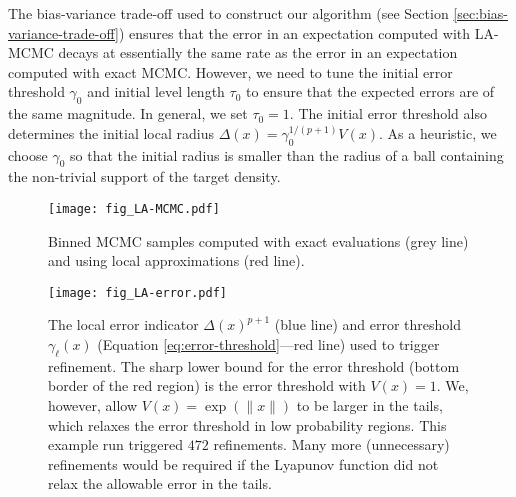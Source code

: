 The bias-variance trade-off used to construct our algorithm (see Section \ref{sec:bias-variance-trade-off}) ensures that the error in an expectation computed with LA-MCMC decays at essentially the same rate as the error in an expectation computed with exact MCMC. However, we need to tune the initial error threshold $\gamma_0$ and initial level length $\tau_0$ to ensure that the expected errors are of the same magnitude. In general, we set $\tau_0=1$. The initial error threshold also determines the initial 
local radius $\Delta(x) = \gamma_0^{1/(p+1)} V(x)$. As a heuristic, we choose $\gamma_0$ so that the initial radius is smaller than the radius of a ball containing the non-trivial support of the target density. 

\begin{figure}[h!]
\centering
    \texttt{[image: fig\_LA-MCMC.pdf]}
    \caption{Binned MCMC samples computed with exact evaluations (grey line) and using local approximations (red line).}
    \label{fig:1d-example-density}
\end{figure}

\begin{figure}[h!]
\centering
    \texttt{[image: fig\_LA-error.pdf]}
    \caption{The local error indicator $\Delta(x)^{p+1}$ (blue line) and error threshold $\gamma_\ell(x)$ (Equation \eqref{eq:error-threshold}---red line) used to trigger refinement. The sharp lower bound for the error threshold (bottom border of the red region) is the error threshold with $V(x) = 1$. We, however, allow $V(x) = \exp(\|x\|)$ to be larger in the tails, which relaxes the error threshold in low probability regions. This example run triggered $472$ refinements. Many more (unnecessary) refinements would be required if the Lyapunov function did not relax the allowable error in the tails.}
    \label{fig:1d-example-error}
\end{figure}

